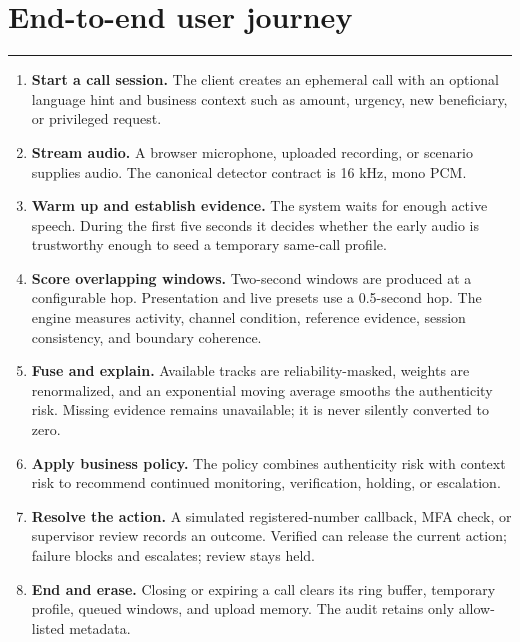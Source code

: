 \documentclass[10pt,a4paper]{article}
\newcommand{\sectionrule}{\vspace{-2mm}\textcolor{blue}{\rule{22mm}{1.2pt}}\vspace{2mm}}
\begin{document}
\section{End-to-end user journey}
\sectionrule

\begin{enumerate}
\item \textbf{Start a call session.} The client creates an ephemeral call with an optional language hint and business context such as amount, urgency, new beneficiary, or privileged request.
\item \textbf{Stream audio.} A browser microphone, uploaded recording, or scenario supplies audio. The canonical detector contract is 16 kHz, mono PCM.
\item \textbf{Warm up and establish evidence.} The system waits for enough active speech. During the first five seconds it decides whether the early audio is trustworthy enough to seed a temporary same-call profile.
\item \textbf{Score overlapping windows.} Two-second windows are produced at a configurable hop. Presentation and live presets use a 0.5-second hop. The engine measures activity, channel condition, reference evidence, session consistency, and boundary coherence.
\item \textbf{Fuse and explain.} Available tracks are reliability-masked, weights are renormalized, and an exponential moving average smooths the authenticity risk. Missing evidence remains unavailable; it is never silently converted to zero.
\item \textbf{Apply business policy.} The policy combines authenticity risk with context risk to recommend continued monitoring, verification, holding, or escalation.
\item \textbf{Resolve the action.} A simulated registered-number callback, MFA check, or supervisor review records an outcome. Verified can release the current action; failure blocks and escalates; review stays held.
\item \textbf{End and erase.} Closing or expiring a call clears its ring buffer, temporary profile, queued windows, and upload memory. The audit retains only allow-listed metadata.
\end{enumerate}
\end{document}
